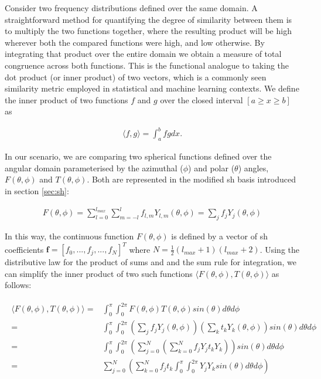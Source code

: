 Consider two frequency distributions defined over the same domain.
A straightforward method for quantifying the degree of similarity between them is to multiply the two functions together, where the resulting product will be high wherever both the compared functions were high, and low otherwise.
By integrating that product over the entire domain we obtain a measure of total congruence across both functions.
This is the functional analogue to taking the dot product (or inner product) of two vectors, which is a commonly seen similarity metric employed in statistical and machine learning contexts.
We define the inner product of two functions $f$ and $g$ over the closed interval $[a \geq x \geq b]$ as

\begin{align}
  \langle f,g \rangle = \int_a^b f g dx.
\end{align}

In our scenario, we are comparing two spherical functions defined over the angular domain parameterised by the azimuthal ($\phi$) and polar ($\theta$) angles, $F(\theta, \phi)$ and $T(\theta, \phi)$.
Both are represented in the modified \gls{sh} basis introduced in section \ref{sec:sh}:

\begin{align}
  F(\theta, \phi) = \sum_{l=0}^{l_{max}} \sum_{m=-l}^l f_{l,m} Y_{l,m}(\theta, \phi) = \sum_j f_jY_j(\theta, \phi)
\end{align}

In this way, the continuous function $F(\theta, \phi)$ is defined by a vector of \gls{sh} coefficients $\mathbf{f} = [f_0, ..., f_j, ..., f_N]^T$ where $N = \frac{1}{2}(l_{max}+1)(l_{max}+2)$.
Using the distributive law for the product of sums and and the sum rule for integration, we can simplify the inner product of two such functions $\langle F(\theta, \phi), T(\theta, \phi) \rangle$ as follows:

\begin{align}
  \begin{split}
    \langle F(\theta, \phi), T(\theta, \phi) \rangle
    =& \int_0^{\pi} \int_0^{2\pi} F(\theta, \phi) T(\theta, \phi) sin(\theta) d\theta d\phi \\
    = & \int_0^{\pi} \int_0^{2\pi} (\sum_j f_jY_j(\theta, \phi)) (\sum_k t_kY_k(\theta, \phi)) sin(\theta) d\theta d\phi \\
    = & \int_0^{\pi} \int_0^{2\pi}  (\sum_{j=0}^N (\sum_{k=0}^N f_jY_j t_kY_k )) sin(\theta) d\theta d\phi \\
    = & \sum_{j=0}^N (\sum_{k=0}^N f_j t_k \int_0^{\pi} \int_0^{2\pi}  Y_j Y_k sin(\theta) d\theta d\phi )
  \end{split}\label{eq:ip1}
\end{align}

